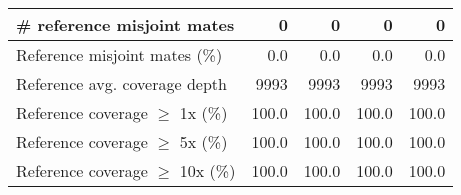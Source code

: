 \documentclass[12pt,a4paper]{article}
\begin{document}
\begin{table}[ht]
\begin{center}
\begin{tabular}{|l*{4}{|r}|}
\# reference misjoint mates & 0 & 0 & 0 & 0 \\ \hline
Reference misjoint mates (\%) & 0.0 & 0.0 & 0.0 & 0.0 \\ \hline
Reference avg. coverage depth & 9993 & 9993 & 9993 & 9993 \\ \hline
Reference coverage $\geq$ 1x (\%) & 100.0 & 100.0 & 100.0 & 100.0 \\ \hline
Reference coverage $\geq$ 5x (\%) & 100.0 & 100.0 & 100.0 & 100.0 \\ \hline
Reference coverage $\geq$ 10x (\%) & 100.0 & 100.0 & 100.0 & 100.0 \\ \hline
\end{tabular}
\end{center}
\end{table}
\end{document}
